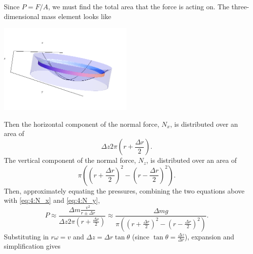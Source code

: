 \documentclass[solutions]{esg8012exam}
\begin{document}
    Since $P = F / A$, we must find the total area that the force is acting on.  The three-dimensional mass element looks like
    \begin{center}\includegraphics[width=0.5\textwidth]{exam1_s4_4.png}\end{center}
    Then the horizontal component of the normal force, $N_x$, is distributed over an area of
    \begin{equation}
      \Delta z 2 \pi\left(r + \frac{\Delta r}{2}\right).
    \end{equation}
    The vertical component of the normal force, $N_z$, is distributed over an area of
    \begin{equation}
      \pi \left( \left(r + \frac{\Delta r}{2}\right)^2 - \left(r - \frac{\Delta r}{2}\right)^2\right).
    \end{equation}
    Then, approximately equating the pressures, combining the two equations above with \autoref{eq:4:N_x} and \autoref{eq:4:N_y},
    \begin{equation}
      P \approx \frac{\Delta m \frac{v^2}{r \pm \Delta r}}{\Delta z 2 \pi\left(r + \frac{\Delta r}{2}\right)} \approx \frac{\Delta m g}{\pi \left( \left(r + \frac{\Delta r}{2}\right)^2 - \left(r - \frac{\Delta r}{2}\right)^2\right)}.
    \end{equation}
    Substituting in $r \omega = v$ and $\Delta z = \Delta r \tan\theta$ (since $\tan\theta = \frac{\Delta z}{\Delta r}$), expansion and simplification gives
\end{document}
